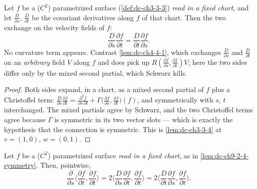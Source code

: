 \begin{lemma}
  \label{lem:dc-ch9-2-4-symmetry}
  \leanok
  Let $f$ be a ($C^2$) parametrized surface (\cref{def:dc-ch3-3-3}) \emph{read in a fixed
  chart}, and let $\frac{D}{\partial s}$, $\frac{D}{\partial t}$ be the covariant
  derivatives along $f$ of that chart. Then the two exchange on the velocity fields of $f$:
  $$
  \frac{D}{\partial s}\frac{\partial f}{\partial t}
    = \frac{D}{\partial t}\frac{\partial f}{\partial s}.
  $$
  No curvature term appears. Contrast \cref{lem:dc-ch4-4-1}, which exchanges
  $\frac{D}{\partial s}$ and $\frac{D}{\partial t}$ on an \emph{arbitrary} field $V$ along
  $f$ and does pick up $R(\frac{\partial f}{\partial s},\frac{\partial f}{\partial t})V$;
  here the two sides differ only by the mixed second partial, which Schwarz kills.

\end{lemma}
\begin{proof}
  \leanok
  \sketch
  Both sides expand, in a chart, as a mixed second partial of $f$ plus a Christoffel term:
  $\frac{D}{\partial s}\frac{\partial f}{\partial t}
   = \frac{\partial^2 f}{\partial s\,\partial t}
     + \Gamma\big(\frac{\partial f}{\partial s},\frac{\partial f}{\partial t}\big)(f)$, and
  symmetrically with $s$, $t$ interchanged. The mixed partials agree by Schwarz, and the two
  Christoffel terms agree because $\Gamma$ is symmetric in its two vector slots --- which is
  exactly the hypothesis that the connection is symmetric. This is \cref{lem:dc-ch3-3-4} at
  $v=(1,0)$, $w=(0,1)$.
\end{proof}
\begin{lemma}
  \label{lem:dc-ch9-2-4-energy-density}
  \leanok
  Let $f$ be a ($C^2$) parametrized surface \emph{read in a fixed chart}, as in
  \cref{lem:dc-ch9-2-4-symmetry}. Then, pointwise,
  $$
  \frac{\partial}{\partial s}\Big\langle\frac{\partial f}{\partial t},\frac{\partial f}{\partial t}\Big\rangle
    = 2\Big\langle\frac{D}{\partial s}\frac{\partial f}{\partial t},\frac{\partial f}{\partial t}\Big\rangle
    = 2\Big\langle\frac{D}{\partial t}\frac{\partial f}{\partial s},\frac{\partial f}{\partial t}\Big\rangle.
  $$
\end{lemma}
